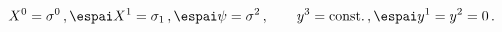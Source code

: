 \begin{equation} \label{firstcase}
X^0=\sigma^0\,, \espai X^1=\sigma_1\,,\espai \psi=\sigma^2\,, \qquad
y^3=\textrm{const.} \,, \espai y^1=y^2=0 \,.
\end{equation}

